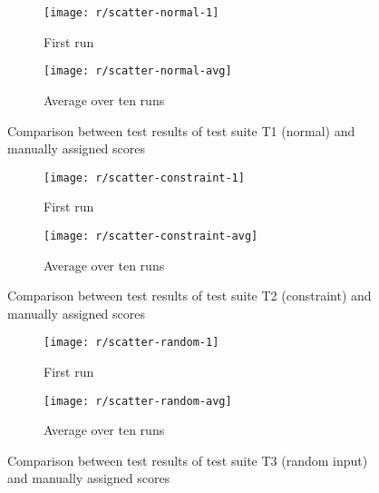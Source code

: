 \begin{figure}[htpb]
    \centering
    \begin{subfigure}{.85\textwidth}
        \texttt{[image: r/scatter-normal-1]}
        \caption{First run}
        \label{fig:scatter_normal_1}
    \end{subfigure}

    \bigskip

    \begin{subfigure}{.85\textwidth}
        \texttt{[image: r/scatter-normal-avg]}
        \caption{Average over ten runs}
        \label{fig:scatter_normal_avg}
    \end{subfigure}
    \caption{Comparison between test results of test suite T1 (normal) and manually assigned scores}
    \label{fig:scatter_normal}
\end{figure}

\begin{figure}[htpb]
    \centering
    \begin{subfigure}{.85\textwidth}
        \texttt{[image: r/scatter-constraint-1]}
        \caption{First run}
        \label{fig:scatter_constraint_1}
    \end{subfigure}

    \bigskip

    \begin{subfigure}{.85\textwidth}
        \texttt{[image: r/scatter-constraint-avg]}
        \caption{Average over ten runs}
        \label{fig:scatter_constraint_avg}
    \end{subfigure}
    \caption{Comparison between test results of test suite T2 (constraint) and manually assigned scores}
    \label{fig:scatter_constraint}
\end{figure}

\begin{figure}[htpb]
    \centering
    \begin{subfigure}{.85\textwidth}
        \texttt{[image: r/scatter-random-1]}
        \caption{First run}
        \label{fig:scatter_random_1}
    \end{subfigure}

    \bigskip

    \begin{subfigure}{.85\textwidth}
        \texttt{[image: r/scatter-random-avg]}
        \caption{Average over ten runs}
        \label{fig:scatter_random_avg}
    \end{subfigure}
    \caption{Comparison between test results of test suite T3 (random input) and manually assigned scores}
    \label{fig:scatter_random}
\end{figure}

